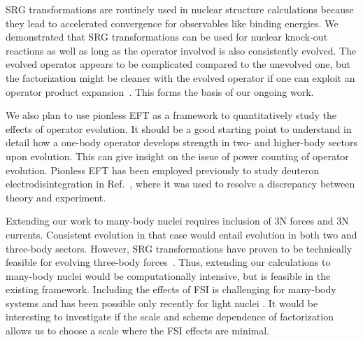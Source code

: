 	SRG transformations are routinely used in nuclear structure calculations
	because	they lead to accelerated convergence for observables like binding
	energies.  We
	demonstrated that SRG transformations can be used for nuclear knock-out
	reactions as well as long as the operator involved is also consistently
	evolved. 	The evolved operator appears to be complicated compared to the
	unevolved one,
	but the factorization might be cleaner with the evolved operator if one can
	exploit an operator product expansion~\cite{Anderson:2010aq,Bogner:2012zm}.
	This forms the basis of our ongoing work.

	We also plan to use pionless EFT as a framework to quantitatively study the
	effects of operator evolution.  It should be a good starting point to
	understand in detail how a one-body operator develops strength in two- and
	higher-body sectors upon evolution.  This can give insight on the issue of
	power	counting of operator evolution.  Pionless EFT has been employed
	previously to
	study deuteron electrodisintegration in Ref.~\cite{Christlmeier:2008ye}, where
	it was used to resolve a discrepancy between theory and experiment.

	Extending our work to many-body nuclei requires inclusion of 3N forces and 3N
	currents.  Consistent evolution in that case would entail evolution in both
	two	and three-body sectors.  However, SRG transformations have proven to be
	technically feasible for evolving three-body
	forces~\cite{Jurgenson:2009qs,Jurgenson:2010wy,Hebeler:2012pr,Wendt:2013bla}.
	Thus, extending our calculations to many-body nuclei would be computationally
	intensive, but is feasible in the existing framework.  Including the effects
	of FSI is challenging for many-body systems and has been
	possible only recently for light nuclei \cite{Bacca:2014tla, Lovato:2015qka}.
	It would be interesting to investigate if the scale and scheme dependence of
	factorization allows us to choose a scale where the FSI effects are minimal.
